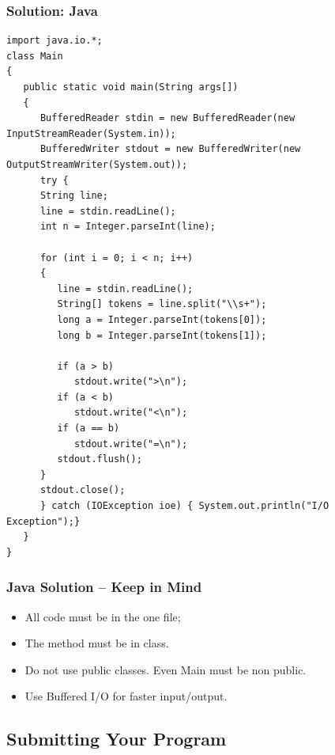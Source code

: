 \documentclass{beamer}
\begin{document}
\begin{frame}[fragile]
  \frametitle{Solution: Java}

  {\tiny
  \begin{block}{}
\begin{verbatim}
import java.io.*;
class Main
{
   public static void main(String args[])
   {
      BufferedReader stdin = new BufferedReader(new InputStreamReader(System.in));
      BufferedWriter stdout = new BufferedWriter(new OutputStreamWriter(System.out));
      try {
      String line;
      line = stdin.readLine();
      int n = Integer.parseInt(line);

      for (int i = 0; i < n; i++)
      {
         line = stdin.readLine();
         String[] tokens = line.split("\\s+");
         long a = Integer.parseInt(tokens[0]);
         long b = Integer.parseInt(tokens[1]);

         if (a > b)
            stdout.write(">\n");
         if (a < b)
            stdout.write("<\n");
         if (a == b)
            stdout.write("=\n");
         stdout.flush();
      }
      stdout.close();
      } catch (IOException ioe) { System.out.println("I/O Exception");}
   }
}
\end{verbatim}
  \end{block}
  }
\end{frame}

\begin{frame}
  \frametitle{Java Solution -- Keep in Mind}

  \begin{itemize}
  \item All code must be in the one file;

    \medskip

  \item The  method must be in  class.

    \medskip

  \item Do not use public classes. Even Main must be non public.

    \medskip

  \item Use Buffered I/O for faster input/output.
  \end{itemize}
\end{frame}

\subsection{Submitting Your Program}
\end{document}

